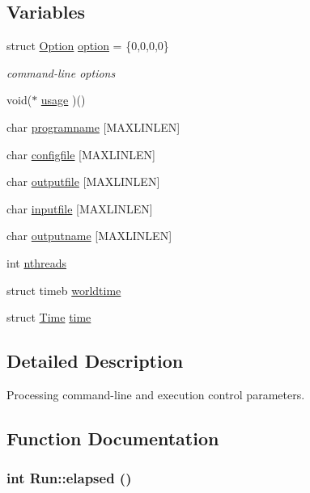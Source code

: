 \subsection*{Variables}
\begin{CompactItemize}
\item 
struct \hyperlink{structOption}{Option} \hyperlink{namespaceRun_724100d30eed9a8f5ac9ec41e76e4c40}{option} = \{0,0,0,0\}
\begin{CompactList}\small\item\em command-line options \item\end{CompactList}\item 
void($\ast$ \hyperlink{namespaceRun_110719db892c2b065597a3ded0d90c2d}{usage} )()
\item 
char \hyperlink{namespaceRun_f2d1163d068ab8ea8c75abd469c4a43f}{programname} \mbox{[}MAXLINLEN\mbox{]}
\item 
char \hyperlink{namespaceRun_3a8e039898acf6eb150d36bfc1b799b6}{configfile} \mbox{[}MAXLINLEN\mbox{]}
\item 
char \hyperlink{namespaceRun_4f57473c9c02d920b7b738c37597f972}{outputfile} \mbox{[}MAXLINLEN\mbox{]}
\item 
char \hyperlink{namespaceRun_70e0ce554030dedb8ebc665cfb95167a}{inputfile} \mbox{[}MAXLINLEN\mbox{]}
\item 
char \hyperlink{namespaceRun_764ba544be98b57556f317ca171d7969}{outputname} \mbox{[}MAXLINLEN\mbox{]}
\item 
int \hyperlink{namespaceRun_b8a2ab3c70feb348697b53df22451f3c}{nthreads}
\item 
struct timeb \hyperlink{namespaceRun_73327ac5b154c258e9b88ea0260d50ad}{worldtime}
\item 
struct \hyperlink{structRun_1_1Time}{Time} \hyperlink{namespaceRun_0b48df515ddd51b80cedcfd90d8c1dc3}{time}
\end{CompactItemize}


\subsection{Detailed Description}
Processing command-line and execution control parameters. 



\subsection{Function Documentation}
\hypertarget{namespaceRun_4062bda6143a9042da86a5f48ad6daf5}{
\subsubsection[{elapsed}]{\setlength{\rightskip}{0pt plus 5cm}int Run::elapsed ()}}
\label{namespaceRun_4062bda6143a9042da86a5f48ad6daf5}



